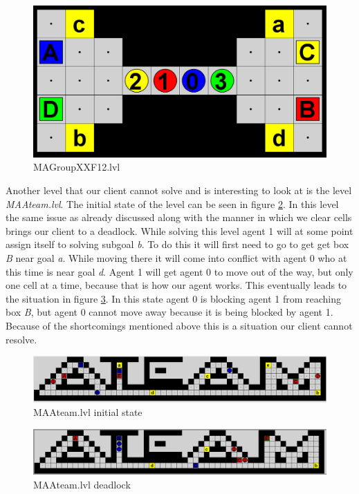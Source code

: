 \documentclass[letterpaper]{article}
\begin{document}
\begin{figure}[!htb]
	\centering
	\includegraphics[scale=0.3]{MAGroupXXF12.PNG}
	\caption{MAGroupXXF12.lvl}
	\label{fig:magroupxx}
\end{figure}


Another level that our client cannot solve and is interesting to look at is the level \textit{MAAteam.lvl}. The initial state of the level can be seen in figure \ref{fig:maateam1}. In this level the same issue as already discussed along with the manner in which we clear cells brings our client to a deadlock. While solving this level agent 1 will at some point assign itself to solving subgoal \textit{b}. To do this it will first need to go to get get box \textit{B} near goal \textit{a}. While moving there it will come into conflict with agent 0 who at this time is near goal \textit{d}. Agent 1 will get agent 0 to move out of the way, but only one cell at a time, because that is how our agent works. This eventually leads to the situation in figure \ref{fig:maateam2}. In this state agent 0 is blocking agent 1 from reaching box \textit{B}, but agent 0 cannot move away because it is being blocked by agent 1. Because of the shortcomings mentioned above this is a situation our client cannot resolve.

\begin{figure}[!htb]
	\centering
	\includegraphics[scale=0.3]{MAAteam1.PNG}
	\caption{MAAteam.lvl initial state}
	\label{fig:maateam1}
\end{figure}

\begin{figure}[!htb]
	\centering
	\includegraphics[scale=0.3]{MAAteam2.PNG}
	\caption{MAAteam.lvl deadlock}
	\label{fig:maateam2}
\end{figure}
\end{document}
